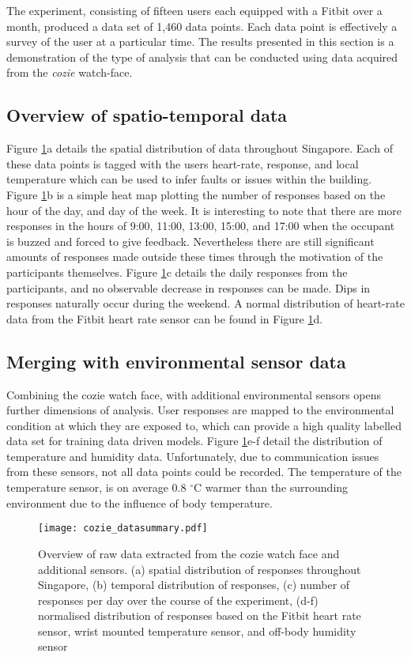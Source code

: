 
The experiment, consisting of fifteen users each equipped with a Fitbit over a month, produced a data set of 1,460 data points. Each data point is effectively a survey of the user at a particular time. The results presented in this section is a demonstration of the type of analysis that can be conducted using data acquired from the \emph{cozie} watch-face.

\subsection{Overview of spatio-temporal data}
Figure \ref{fig:summary}a details the spatial distribution of data throughout Singapore. Each of these data points is tagged with the users heart-rate, response, and local temperature which can be used to infer faults or issues within the building. Figure \ref{fig:summary}b is a simple heat map plotting the number of responses based on the hour of the day, and day of the week. It is interesting to note that there are more responses in the hours of 9:00, 11:00, 13:00, 15:00, and 17:00 when the occupant is buzzed and forced to give feedback. Nevertheless there are still significant amounts of responses made outside these times through the motivation of the participants themselves. Figure \ref{fig:summary}c details the daily responses from the participants, and no observable decrease in responses can be made. Dips in responses naturally occur during the weekend. A normal distribution of heart-rate data from the Fitbit heart rate sensor can be found in Figure \ref{fig:summary}d.

\subsection{Merging with environmental sensor data}
Combining the cozie watch face, with additional environmental sensors opens further dimensions of analysis. User responses are mapped to the environmental condition at which they are exposed to, which can provide a high quality labelled data set for training data driven models. Figure \ref{fig:summary}e-f detail the distribution of temperature and humidity data. Unfortunately, due to communication issues from these sensors, not all data points could be recorded. The temperature of the temperature sensor, is on average 0.8 $^\circ$C warmer than the surrounding environment due to the influence of body temperature. 

\begin{figure}
\begin{center}
\texttt{[image: cozie\_datasummary.pdf]}
\caption{Overview of raw data extracted from the cozie watch face and additional sensors. (a) spatial distribution of responses throughout Singapore, (b) temporal distribution of responses, (c) number of responses per day over the course of the experiment, (d-f) normalised distribution of responses based on the Fitbit heart rate sensor, wrist mounted temperature sensor, and off-body humidity sensor }
\label{fig:summary}
\end{center}
\end{figure}



